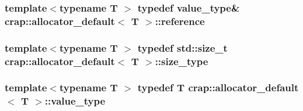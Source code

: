 \hypertarget{classcrap_1_1allocator__default_a58372b140fc5c63e4be9ce32b93ec942}{
\subsubsection[{reference}]{\setlength{\rightskip}{0pt plus 5cm}template$<$typename T $>$ typedef {\bf value\-\_\-type}\& {\bf crap\-::allocator\-\_\-default}$<$ T $>$\-::{\bf reference}}}\label{classcrap_1_1allocator__default_a58372b140fc5c63e4be9ce32b93ec942}
\hypertarget{classcrap_1_1allocator__default_aec0689db195f5f8ce40f789b17ab4d55}{
\subsubsection[{size\-\_\-type}]{\setlength{\rightskip}{0pt plus 5cm}template$<$typename T $>$ typedef std\-::size\-\_\-t {\bf crap\-::allocator\-\_\-default}$<$ T $>$\-::{\bf size\-\_\-type}}}\label{classcrap_1_1allocator__default_aec0689db195f5f8ce40f789b17ab4d55}
\hypertarget{classcrap_1_1allocator__default_ac3902c99d9b046ca1e35bba0d6f63dc9}{
\subsubsection[{value\-\_\-type}]{\setlength{\rightskip}{0pt plus 5cm}template$<$typename T $>$ typedef T {\bf crap\-::allocator\-\_\-default}$<$ T $>$\-::{\bf value\-\_\-type}}}\label{classcrap_1_1allocator__default_ac3902c99d9b046ca1e35bba0d6f63dc9}



